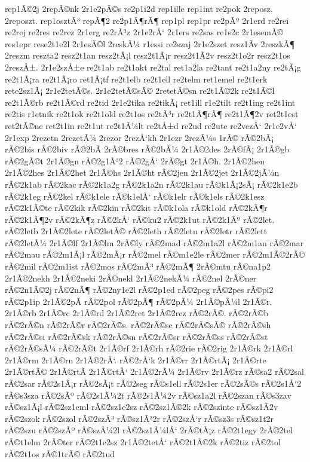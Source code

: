 {rep1Ã©2j
2repÃ©nk
2r1e2pÃ©s
re2p1i2d
rep1ille
rep1int
re2pok
2reposz.
2reposzt.
rep1osztÃ³
repÃ¶2
re2p1Ã¶rÃ¶
rep1pl
rep1pr
re2pÃº
2r1erd
re2rei
re2rej
re2res
re2rez
2r1erg
re2rÃ³z
2r1e2rÅ‘
2r1ers
re2sas
re1s2c
2r1esemÃ©
res1epr
rese2t1e2l
2r1esÃ©l
2reskÃ¼
r1essi
re2szaj
2r1e2szet
resz1Ã­v
2reszkÃ¶
2reszm
reszta2
resz2t1an
resz2tÃ¡l
resz2t1Ã¡r
resz2t1Ã­2v
resz2t1o2r
resz2t1os
2reszÅ±.
2r1e2szÅ±e
re2t1ab
re2t1akt
re2tal
ret1a2la
re2tant
re2t1a2ny
re2tÃ¡g
re2t1Ã¡ra
re2t1Ã¡ro
ret1Ã¡tf
re2t1elb
re2t1ell
re2telm
ret1emel
re2t1erk
rete2sz1Ã¡
2r1e2tetÃ©s.
2r1e2tetÃ©sÃ©
2retetÃ©sn
re2t1Ã©2k
re2t1Ã©l
re2t1Ã©rb
re2t1Ã©rd
re2tid
2r1e2tika
re2tikÃ¡
ret1ill
r1e2tilt
re2t1ing
re2t1int
re2tis
r1etnik
re2t1ok
re2t1old
re2t1os
re2tÃ³r
re2t1Ã¶rÃ¶
re2t1Ã¶2v
ret2t1est
ret2tÃ©ne
ret2t1in
re2t1ut
re2t1Ã¼lt
re2tÅ±d
re2ud
re2ute
re2vezÅ‘
2r1e2vÅ‘
2r1exp
2rezetn
2rezetÃ¼
2rezor
2rezÅ‘kh
2r1ezr
2rezÃ¼s
1rÃ©
rÃ©2bÃ¡
rÃ©2bis
rÃ©2biv
rÃ©2bÃ­
2rÃ©bres
rÃ©2bÃ¼
2r1Ã©2des
2rÃ©fÃ¡
2r1Ã©gb
rÃ©2gÃ©t
2r1Ã©gn
rÃ©2g1Ã³2
rÃ©2gÅ‘
2rÃ©gt
2r1Ã©h.
2r1Ã©2hen
2r1Ã©2hes
2r1Ã©2het
2r1Ã©hs
2r1Ã©ht
rÃ©2jen
2r1Ã©2jet
2r1Ã©2jÃ¼n
rÃ©2k1ab
rÃ©2kac
rÃ©2k1a2g
rÃ©2k1a2n
rÃ©2k1au
rÃ©k1Ã¡2sÃ¡
rÃ©2k1e2b
rÃ©2k1eg
rÃ©2kel
rÃ©k1ele
rÃ©k1elÅ‘
rÃ©k1elr
rÃ©k1els
rÃ©2k1esz
rÃ©2k1Ã©te
rÃ©2kik
rÃ©2kin
rÃ©2kit
rÃ©k1ola
rÃ©k1old
rÃ©2kÃ¶r
rÃ©2k1Ã¶2v
rÃ©2kÃ¶z
rÃ©2kÅ‘
rÃ©ku2
rÃ©2k1ut
rÃ©2k1Ãº
rÃ©2let.
rÃ©2letb
2r1Ã©2lete
rÃ©2letÃ©
rÃ©2leth
rÃ©2letn
rÃ©2letr
rÃ©2lett
rÃ©2letÃ¼
2r1Ã©lf
2r1Ã©lm
2rÃ©ly
rÃ©2mad
rÃ©2m1a2l
rÃ©2m1an
rÃ©2mar
rÃ©2mau
rÃ©2m1Ã¡l
rÃ©2mÃ¡r
rÃ©2mel
rÃ©m1e2le
rÃ©2mer
rÃ©2m1Ã©2rÃ©
rÃ©2mil
rÃ©2m1ist
rÃ©2mos
rÃ©2mÃ³
rÃ©2mÃ¶
2rÃ©mtu
rÃ©na1p2
2r1Ã©2nekh
2r1Ã©2neki
2rÃ©nekl
2r1Ã©2nekÃ¼
rÃ©2nel
2rÃ©ner
rÃ©2n1Ã©2j
rÃ©2nÃ¶
rÃ©2ny1e2l
rÃ©2p1ed
rÃ©2peg
rÃ©2pes
rÃ©pi2
rÃ©2p1ip
2r1Ã©2pÃ­
rÃ©2pol
rÃ©2pÃ¶
rÃ©2pÃ¼
2r1Ã©pÃ¼l
2r1Ã©r.
2r1Ã©rb
2r1Ã©rc
2r1Ã©rd
2r1Ã©2ret
2r1Ã©2rez
rÃ©2rÃ©.
rÃ©2rÃ©b
rÃ©2rÃ©n
rÃ©2rÃ©r
rÃ©2rÃ©s.
rÃ©2rÃ©se
rÃ©2rÃ©sÃ©
rÃ©2rÃ©sh
rÃ©2rÃ©si
rÃ©2rÃ©sk
rÃ©2rÃ©sn
rÃ©2rÃ©sr
rÃ©2rÃ©ss
rÃ©2rÃ©st
rÃ©2rÃ©sÃ¼
rÃ©2rÃ©t
2r1Ã©rf
2r1Ã©rh
rÃ©2rie
rÃ©2rig
2r1Ã©rk
2r1Ã©rl
2r1Ã©rm
2r1Ã©rn
2r1Ã©2rÅ‘.
rÃ©2rÅ‘k
2r1Ã©rr
2r1Ã©rtÃ¡
2r1Ã©rte
2r1Ã©rtÃ©
2r1Ã©rtÃ­
2r1Ã©rtÅ‘
2r1Ã©2rÃ¼
2r1Ã©rv
2r1Ã©rz
rÃ©sa2
rÃ©2sal
rÃ©2sar
rÃ©2s1Ã¡r
rÃ©2sÃ¡t
rÃ©2seg
rÃ©s1ell
rÃ©2s1er
rÃ©2sÃ©s
rÃ©2s1Å‘2
rÃ©s3sza
rÃ©2sÃº
rÃ©2s1Ã¼2t
rÃ©2s1Ã¼2v
rÃ©sz1a2l
rÃ©2szan
rÃ©s3zav
rÃ©sz1Ã¡l
rÃ©2sz1eml
rÃ©2sz1e2sz
rÃ©2sz1Ã©2k
rÃ©2szinte
rÃ©sz1Ã­2v
rÃ©2szok
rÃ©2szol
rÃ©2szÃ³
rÃ©sz1Ã³2r
rÃ©2szÅ‘r
rÃ©sz3s
rÃ©sz1t2r
rÃ©2szu
rÃ©2szÃº
rÃ©szÃ¼2l
rÃ©2sz1Ã¼lÅ‘
2rÃ©tÃ¡z
rÃ©2t1egy
2rÃ©2tel
rÃ©t1elm
2rÃ©ter
rÃ©2t1e2sz
2r1Ã©2tetÅ‘
rÃ©2t1Ã©2k
rÃ©2tiz
rÃ©2tol
rÃ©2t1os
rÃ©1trÃ©
rÃ©2tud
}
